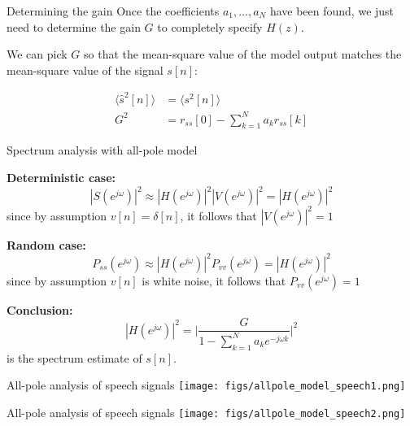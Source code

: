 \documentclass[10pt, aspectratio=169]{beamer}
\begin{document}
\begin{frame}{Determining the gain}
	Once the coefficients $a_1, \ldots, a_N$ have been found, we just need to determine the gain $G$ to completely specify $H(z)$.
	
	\vspace{0.5cm}
	We can pick $G$ so that the mean-square value of the model output matches the mean-square value of the signal $s[n]$:
	
	\begin{align*}
		\langle \hat{s}^2[n] \rangle &= \langle s^2[n] \rangle \\
		G^2 &= r_{ss}[0] - \sum_{k =1}^N a_kr_{ss}[k] \tag{after some algebra}
	\end{align*}
\end{frame}

\begin{frame}{Spectrum analysis with all-pole model}
	
	\textbf{Deterministic case:}
	\begin{equation*}
		|S(e^{j\omega})|^2 \approx |H(e^{j\omega})|^2|V(e^{j\omega})|^2 = |H(e^{j\omega})|^2
	\end{equation*}
	since by assumption $v[n] = \delta[n]$, it follows that $|V(e^{j\omega})|^2 = 1$
	
	\vspace{0.5cm}
	\textbf{Random case:}
	\begin{equation*}
	P_{ss}(e^{j\omega}) \approx |H(e^{j\omega})|^2P_{vv}(e^{j\omega}) = |H(e^{j\omega})|^2
	\end{equation*}
	since by assumption $v[n]$ is white noise, it follows that $P_{vv}(e^{j\omega}) = 1$
		
	\vspace{0.5cm}
	\textbf{Conclusion:}
	\begin{equation*}
		|H(e^{j\omega})|^2 = \bigg|\frac{G}{1 - \sum_{k =1}^Na_ke^{-j\omega k}}\bigg|^2
	\end{equation*}
	is the spectrum estimate of $s[n]$.
\end{frame}

\begin{frame}{All-pole analysis of speech signals}
	\centering
	\texttt{[image: figs/allpole\_model\_speech1.png]}
\end{frame}


\begin{frame}{All-pole analysis of speech signals}
	\centering
	\texttt{[image: figs/allpole\_model\_speech2.png]}
\end{frame}
\end{document}

